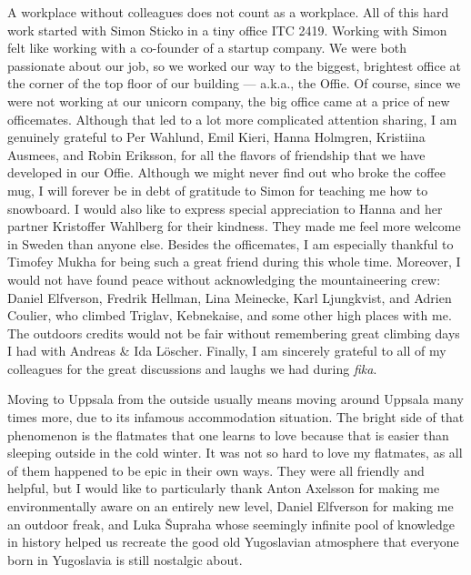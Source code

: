 \documentclass{UUThesisTemplate}
\begin{document}
{\par
A workplace without colleagues does not count as a workplace. All of this hard work started with Simon Sticko in a tiny office ITC 2419. Working with Simon felt like working with a co-founder of a startup company. We were both passionate about our job, so we worked our way to the biggest, brightest office at the corner of the top floor of our building --- a.k.a., the Offie. Of course, since we were not working at our unicorn company, the big office came at a price of new officemates. Although that led to a lot more complicated attention sharing, I am genuinely grateful to Per Wahlund, Emil Kieri, Hanna Holmgren, Kristiina Ausmees, and Robin Eriksson, for all the flavors of friendship that we have developed in our Offie. Although we might never find out who broke the coffee mug, I will forever be in debt of gratitude to Simon for teaching me how to snowboard. I would also like to express special appreciation to Hanna and her partner Kristoffer Wahlberg for their kindness. They made me feel more welcome in Sweden than anyone else. Besides the officemates, I am especially thankful to Timofey Mukha for being such a great friend during this whole time. Moreover, I would not have found peace without acknowledging the mountaineering crew: Daniel Elfverson, Fredrik Hellman, Lina Meinecke, Karl Ljungkvist, and Adrien Coulier, who climbed Triglav, Kebnekaise, and some other high places with me. The outdoors credits would not be fair without remembering great climbing days I had with Andreas \& Ida Löscher. Finally, I am sincerely grateful to all of my colleagues for the great discussions and laughs we had during \emph{fika}. 

\par
Moving to Uppsala from the outside usually means moving around Uppsala many times more, due to its infamous accommodation situation. The bright side of that phenomenon is the flatmates that one learns to love because that is easier than sleeping outside in the cold winter. It was not so hard to love my flatmates, as all of them happened to be epic in their own ways. They were all friendly and helpful, but I would like to particularly thank Anton Axelsson for making me environmentally aware on an entirely new level, Daniel Elfverson for making me an outdoor freak, and Luka Šupraha whose seemingly infinite pool of knowledge in history helped us recreate the good old Yugoslavian atmosphere that everyone born in Yugoslavia is still nostalgic about.

}
\end{document}
